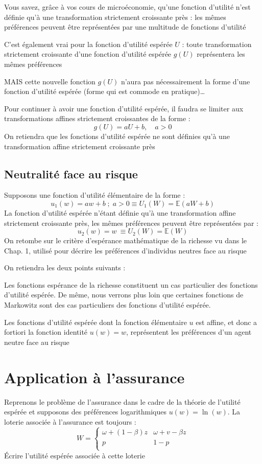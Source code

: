 \documentclass[a4paper, 12pt]{report}
\begin{document}
Vous savez, grâce à vos cours de microéconomie, qu'une fonction d'utilité n'est définie qu'à une transformation strictement croissante près : les mêmes préférences peuvent être représentées par une multitude de fonctions d'utilité

C'est également vrai pour la fonction d'utilité espérée $U$ : toute transformation strictement croissante d'une fonction d'utilité espérée $g(U)$ représentera les mêmes préférences

MAIS cette nouvelle fonction $g(U)$ n'aura pas nécessairement la forme d'une fonction d'utilité espérée (forme qui est commode en pratique)…

Pour continuer à avoir une fonction d'utilité espérée, il faudra se limiter aux transformations affines strictement croissantes de la forme :
$$
g(U)=aU+b, \quad a>0
$$
On retiendra que les fonctions d'utilité espérée ne sont définies qu'à une transformation affine strictement croissante près

\subsection{Neutralité face au risque}

Supposons une fonction d'utilité élémentaire de la forme :
$$
u_1(w)=aw+b\;;\;a>0 \equiv U_1(W)=\mathbb{E}(aW+b)
$$
La fonction d'utilité espérée n'étant définie qu'à une transformation affine strictement croissante près, les mêmes préférences peuvent être représentées par :
$$
u_2(w)=w\ \equiv U_2(W)=\mathbb{E}(W)
$$
On retombe sur le critère d'espérance mathématique de la richesse vu dans le Chap. 1, utilisé pour décrire les préférences d'individus neutres face au risque

On retiendra les deux points suivants :

Les fonctions espérance de la richesse constituent un cas particulier des fonctions d'utilité espérée. De même, nous verrons plus loin que certaines fonctions de Markowitz sont des cas particuliers des fonctions d'utilité espérée.

Les fonctions d'utilité espérée dont la fonction élémentaire $u$ est affine, et donc a fortiori la fonction identité $u(w)=w$, représentent les préférences d'un agent neutre face au risque

\section{Application à l'assurance}

Reprenons le problème de l'assurance dans le cadre de la théorie de l'utilité espérée et supposons des préférences logarithmiques $u(w)=\ln(w)$. La loterie associée à l'assurance est toujours :
$$
W= \left\{\begin{matrix}
	\omega + (1-\beta)z& \omega + v -\beta z \\
	p & 1-p \\
\end{matrix}\right.
$$
Écrire l'utilité espérée associée à cette loterie
\end{document}
